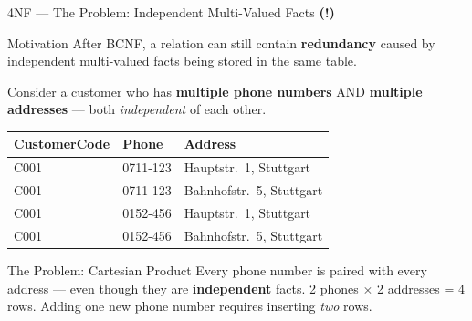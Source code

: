 \begin{frame}{4NF --- The Problem: Independent Multi-Valued Facts \textbf{(!)}}
  \begin{block}{Motivation}
    After BCNF, a relation can still contain \textbf{redundancy} caused by
    independent multi-valued facts being stored in the same table.
  \end{block}

  Consider a customer who has \textbf{multiple phone numbers} AND \textbf{multiple
  addresses} --- both \emph{independent} of each other.

  \vspace{6pt}
  \begin{center}
  \scriptsize
  \begin{tabular}{lll}
    \toprule
    \textbf{CustomerCode} & \textbf{Phone} & \textbf{Address} \\
    \midrule
    C001 & 0711-123 & Hauptstr.\ 1, Stuttgart \\
    C001 & 0711-123 & Bahnhofstr.\ 5, Stuttgart \\
    C001 & 0152-456 & Hauptstr.\ 1, Stuttgart \\
    C001 & 0152-456 & Bahnhofstr.\ 5, Stuttgart \\
    \bottomrule
  \end{tabular}
  \end{center}
  \normalsize

  \vspace{4pt}
  \begin{alertblock}{The Problem: Cartesian Product}
    Every phone number is paired with every address --- even though they are
    \textbf{independent} facts.  2 phones $\times$ 2 addresses = 4 rows.
    Adding one new phone number requires inserting \emph{two} rows.
  \end{alertblock}
\end{frame}

